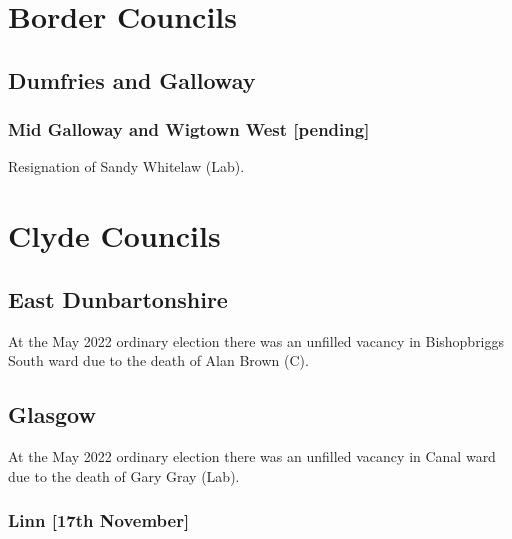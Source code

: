 \documentclass[a4paper,openany]{book}
\begin{document}
\begin{resultsiii}
\section{Border Councils}

\subsection*{Dumfries and Galloway}

\subsubsection*{Mid Galloway and Wigtown West \hspace*{\fill}\nolinebreak[1]%
	\enspace\hspace*{\fill}
	[pending]}


Resignation of Sandy Whitelaw (Lab).

\section{Clyde Councils}

\subsection*{East Dunbartonshire}

At the May 2022 ordinary election there was an unfilled vacancy in Bishopbriggs South ward due to the death of Alan Brown (C).%

\subsection*{Glasgow}

At the May 2022 ordinary election there was an unfilled vacancy in Canal ward due to the death of Gary Gray (Lab).%

\subsubsection*{Linn \hspace*{\fill}\nolinebreak[1]%
	\enspace\hspace*{\fill}
	[17th November]}


\end{resultsiii}
\end{document}

